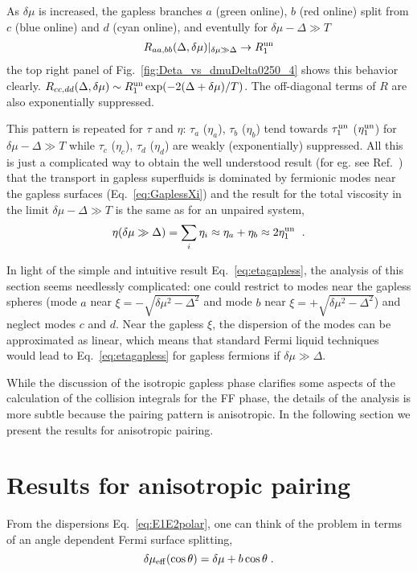 \documentclass[10pt, aps, prd, superscriptaddress, nofootinbib, 
               amsmath, amssymb, twocolumn,
               preprintnumbers, showpacs,
               raggedbottom,
               floatfix]{revtex4-1}
\newcommand{\un}{{\rm{un}}}
\begin{document}
As $\delta\mu$ is increased, the gapless branches $a$ (green online), $b$ (red
online) split from $c$ (blue online) and $d$ (cyan online), and eventully for $\delta\mu-\Delta\gg T$
\begin{equation}
\begin{split}
R_{aa,bb}(\Delta,\delta\mu)|_{\delta\mu\gg \Delta}\rightarrow R_{1}^{\un}
\end{split}
\end{equation}
the top right panel of Fig.~\ref{fig:Deta_vs_dmuDelta0250_4} shows this
behavior clearly. $R_{cc,dd}(\Delta,\delta\mu)\sim
R_{1}^{\un}\exp(-2(\Delta+\delta\mu)/T)$. The off-diagonal terms of $R$ are
also exponentially suppressed. 

This pattern is repeated for $\tau$ and $\eta$: $\tau_a$ ($\eta_a$), $\tau_b$
($\eta_b$) tend towards $\tau_1^\un$ ($\eta_1^\un$) for $\delta\mu-\Delta\gg T$
while $\tau_c$ ($\eta_c$), $\tau_d$ ($\eta_d$) are weakly (exponentially) suppressed.
All this is just a complicated way to obtain the well understood result (for eg. see Ref.~\cite{Alford:2005}) that
the transport in gapless superfluids is dominated by fermionic modes near the
gapless surfaces (Eq.~\ref{eq:GaplessXi})  and the result for the
total viscosity in the limit $\delta\mu-\Delta\gg T$ is the same as for an
unpaired system,
\begin{equation}
\eta(\delta\mu\gg\Delta) = \sum_i \eta_i \approx \eta_a+\eta_b \approx 2\eta_1^{\un}
~\label{eq:etagapless}\;.
\end{equation}

In light of the simple and intuitive result Eq.~\ref{eq:etagapless}, the  
analysis of this section seems needlessly complicated: one could restrict
to modes near the gapless spheres (mode $a$ near
$\xi=-\sqrt{\delta\mu^2-\Delta^2}$ and mode $b$ near
$\xi=+\sqrt{\delta\mu^2-\Delta^2}$) and neglect modes $c$ and $d$. Near the gapless
$\xi$, the dispersion of the modes can be approximated as linear, which means
that standard Fermi liquid techniques would lead to Eq.~\ref{eq:etagapless} for
gapless fermions if $\delta\mu\gg\Delta$. 

While the discussion of the isotropic gapless phase clarifies some aspects of
the calculation of the collision integrals for the FF phase, the details of the
analysis is more subtle because the pairing pattern is anisotropic. In the
following section we present the results for anisotropic 
pairing. 

\section{Results for anisotropic pairing}
\label{sec:anisotropic}
 From the dispersions Eq.~\ref{eq:E1E2polar}, one can think of the problem in
terms of an angle dependent Fermi surface splitting,
\begin{equation}
\delta\mu_{\rm{eff}}(\cos\theta) = \delta\mu +b \cos\theta\;.
\end{equation}
\end{document}
